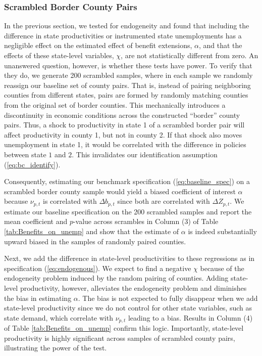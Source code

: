 \documentclass[12pt]{article}
\newcommand{\1}{\mathbf{1}}
\begin{document}
\subsubsection{Scrambled Border County Pairs}

In the previous section, we tested for endogeneity and found that including the difference in state productivities or instrumented state unemployments has a negligible effect on the estimated effect of benefit extensions, $\alpha$, and that the effects of these state-level variables, $\chi$, are not statistically different from zero. An unanswered question, however, is whether these tests have power. To verify that they do, we generate 200 scrambled samples, where in each sample we randomly reassign our baseline set of county pairs. That is, instead of pairing neighboring counties from different states, pairs are formed by randomly matching counties from the original set of border counties. This mechanically introduces a discontinuity in economic conditions across the constructed ``border'' county pairs. Thus, a shock to productivity in state 1 of a scrambled border pair will affect productivity in county 1, but not in county 2. If that shock also moves unemployment in state 1, it would be correlated with the difference in policies between state $1$ and $2$. This invalidates our identification assumption (\ref{eq:bc_identify}).

Consequently, estimating our benchmark specification (\ref{eq:baseline_spec}) on a scrambled border county sample would yield a biased coefficient of interest $\alpha$ because $\nu_{p,t}$ is correlated with $\Delta b_{p,t}$ since both are correlated with $\Delta Z_{p,t}$. We estimate our baseline specification on the 200 scrambled samples and report the mean coefficient and $p$-value across scrambles in Column (3) of Table \ref{tab:Benefits_on_unemp} and show that the estimate of $\alpha$ is indeed substantially upward biased in the samples of randomly paired counties.

Next, we add the difference in state-level productivities to these regressions as in specification (\ref{eq:endogenous}). We expect to find a negative $\chi$ because of the endogeneity problem induced by the random pairing of counties. Adding state-level productivity, however, alleviates the endogeneity problem and diminishes the bias in estimating $\alpha$. The bias is not expected to fully disappear when we add state-level productivity since we do not control for other state variables, such as state demand, which correlate with $\nu_{p,t}$ leading to a bias. Results in Column (4) of Table \ref{tab:Benefits_on_unemp} confirm this logic. Importantly, state-level productivity is highly significant across samples of scrambled county pairs, illustrating the power of the test.
\end{document}
